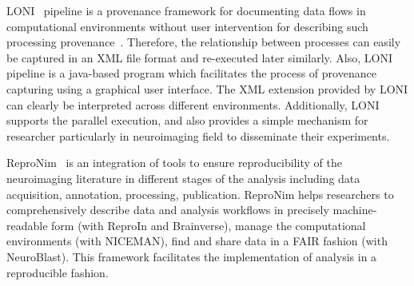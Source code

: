 LONI~\cite{rex2003loni} pipeline is a 
provenance framework for documenting data flows in computational 
environments without user intervention for describing such processing 
provenance~\cite{mackenzie2008neuroimaging}. Therefore, the 
relationship between processes can easily be captured in an XML file 
format and re-executed later similarly. 
Also, LONI pipeline is a java-based 
program which facilitates the process of provenance capturing using a 
graphical user interface. The XML extension provided by LONI can 
clearly be interpreted across different environments. Additionally, 
LONI supports the parallel execution, and also provides a simple 
mechanism for researcher particularly in neuroimaging field to 
disseminate their experiments. 

ReproNim~\cite{kennedy2019everything} is an 
integration of tools to ensure reproducibility of the neuroimaging 
literature in different stages of the analysis including data 
acquisition, annotation, processing, publication. ReproNim helps 
researchers to comprehensively describe data and analysis workflows in 
precisely machine-readable form (with ReproIn and Brainverse), manage 
the computational environments (with NICEMAN), find and share data in a 
FAIR fashion (with NeuroBlast). This framework facilitates the 
implementation of analysis in a reproducible fashion. 



